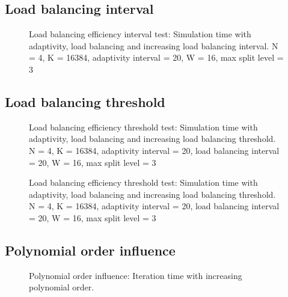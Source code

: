 \subsection{Load balancing interval} \label{subsection:results:load_balancing_performance:interval}

\begin{figure}[H]
	\centering
	
	\caption{Load balancing efficiency interval test: Simulation time with adaptivity, load balancing and increasing load balancing interval. N = 4, K = 16384, adaptivity interval = 20, W = 16, max split level = 3}
	\label{fig:load_balancing_efficiency_interval}
\end{figure}

\subsection{Load balancing threshold} \label{subsection:results:load_balancing_performance:threshold}

\begin{figure}[H]
	\centering
	
	\caption{Load balancing efficiency threshold test: Simulation time with adaptivity, load balancing and increasing load balancing threshold. N = 4, K = 16384, adaptivity interval = 20, load balancing interval = 20, W = 16, max split level = 3}
	\label{fig:load_balancing_efficiency_threshold_s3}
\end{figure}

\begin{figure}[H]
	\centering
	
	\caption{Load balancing efficiency threshold test: Simulation time with adaptivity, load balancing and increasing load balancing threshold. N = 4, K = 16384, adaptivity interval = 20, load balancing interval = 20, W = 16, max split level = 3}
	\label{fig:load_balancing_efficiency_threshold_s5}
\end{figure}

\subsection{Polynomial order influence} \label{subsection:results:load_balancing_performance:polynomial_order}

\begin{figure}[H]
	\centering
	
	\caption{Polynomial order influence: Iteration time with increasing polynomial order.}
	\label{fig:N_influence}
\end{figure}

